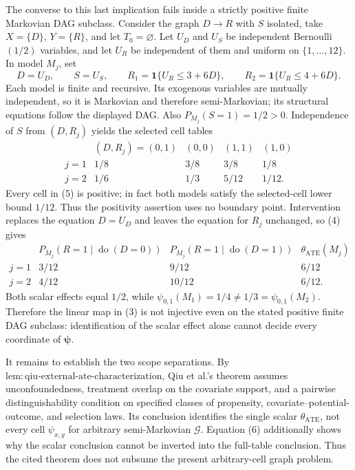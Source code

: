 The converse to this last implication fails inside a strictly positive finite Markovian DAG subclass.  Consider the graph \(D\to R\) with \(S\) isolated, take \(X=\{D\}\), \(Y=\{R\}\), and let \(T_0=\varnothing\).  Let \(U_D\) and \(U_S\) be independent Bernoulli\((1/2)\) variables, and let \(U_R\) be independent of them and uniform on \(\{1,\ldots,12\}\).  In model \(M_j\), set
\[
D=U_D,\qquad S=U_S,
\qquad
R_1=\mathbf 1\{U_R\le 3+6D\},
\qquad
R_2=\mathbf 1\{U_R\le 4+6D\}.
\tag{4}
\]
Each model is finite and recursive.  Its exogenous variables are mutually independent, so it is Markovian and therefore semi-Markovian; its structural equations follow the displayed DAG.  Also \(P_{M_j}(S=1)=1/2>0\).  Independence of \(S\) from \((D,R_j)\) yields the selected cell tables
\[
\begin{array}{c|cccc}
&(D,R_j)=(0,1)&(0,0)&(1,1)&(1,0)\\ \hline
j=1&1/8&3/8&3/8&1/8\\
j=2&1/6&1/3&5/12&1/12.
\end{array}
\tag{5}
\]
Every cell in (5) is positive; in fact both models satisfy the selected-cell lower bound \(1/12\).  Thus the positivity assertion uses no boundary point.  Intervention replaces the equation \(D=U_D\) and leaves the equation for \(R_j\) unchanged, so (4) gives
\[
\begin{array}{c|cc|c}
&P_{M_j}(R=1\mid\operatorname{do}(D=0))
&P_{M_j}(R=1\mid\operatorname{do}(D=1))
&\theta_{\mathrm{ATE}}(M_j)\\ \hline
j=1&3/12&9/12&6/12\\
j=2&4/12&10/12&6/12.
\end{array}
\tag{6}
\]
Both scalar effects equal \(1/2\), while \(\psi_{0,1}(M_1)=1/4\ne1/3=\psi_{0,1}(M_2)\).  Therefore the linear map in (3) is not injective even on the stated positive finite DAG subclass: identification of the scalar effect alone cannot decide every coordinate of \(\boldsymbol\psi\).

It remains to establish the two scope separations.  By \(\mathrm{lem:qiu\text{-}external\text{-}ate\text{-}characterization}\), Qiu et al.'s theorem assumes unconfoundedness, treatment overlap on the covariate support, and a pairwise distinguishability condition on specified classes of propensity, covariate--potential-outcome, and selection laws.  Its conclusion identifies the single scalar \(\theta_{\mathrm{ATE}}\), not every cell \(\psi_{x,y}\) for arbitrary semi-Markovian \(\mathcal G\).  Equation (6) additionally shows why the scalar conclusion cannot be inverted into the full-table conclusion.  Thus the cited theorem does not subsume the present arbitrary-cell graph problem.

